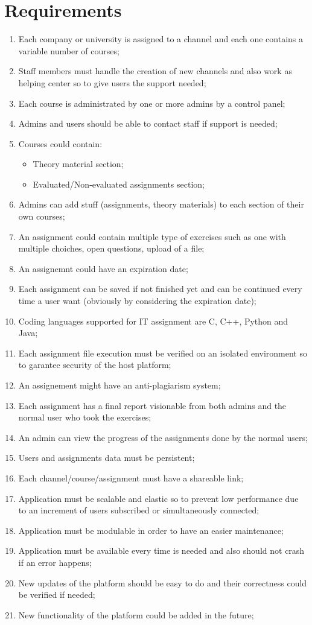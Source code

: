 \documentclass[a4paper,11pt]{report}
\begin{document}
	\section*{Requirements}
	\begin{enumerate}
		\item Each company or university is assigned to a channel and each one contains a variable number of courses;
		\item Staff members must handle the creation of new channels and also work as helping center so to give users the support needed;
		\item Each course is administrated by one or more admins by a control panel;
		\item Admins and users should be able to contact staff if support is needed;
		\item Courses could contain:
		\begin{itemize}
			\item Theory material section;
			\item Evaluated/Non-evaluated assignments section;
		\end{itemize}
		\item Admins can add stuff (assignments, theory materials) to each section of their own courses;
		\item An assignment could contain multiple type of exercises such as one with multiple choiches, open questions, upload of a file;
		\item An assignemnt could have an expiration date;
		\item Each assignment can be saved if not finished yet and can be continued every time a user want (obviously by considering the expiration date);
		\item Coding languages supported for IT assignment are C, C++, Python and Java;
		\item Each assignment file execution must be verified on an isolated environment so to garantee security of the host platform;
		\item An assignement might have an anti-plagiarism system;
		\item Each assignment has a final report visionable from both admins and the normal user who took the exercises;
		\item An admin can view the progress of the assignments done by the normal users;
		\item Users and assignments data must be persistent;
		\item Each channel/course/assignment must have a shareable link;
		\item Application must be scalable and elastic so to prevent low performance due to an increment of users subscribed or simultaneously connected;
		\item Application must be modulable in order to have an easier maintenance;
		\item Application must be available every time is needed and also should not crash if an error happens;
		\item New updates of the platform should be easy to do and their correctness could be verified if needed;
		\item New functionality of the platform could be added in the future;
	\end{enumerate}
\end{document}
